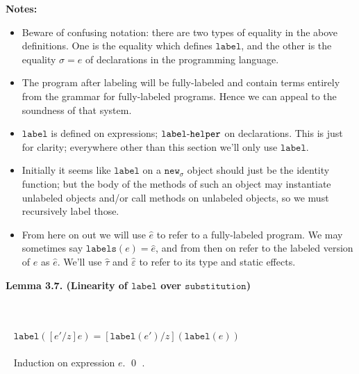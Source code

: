 \documentclass{llncs}
\newcommand{\keywadj}[1]{\mathtt{#1}}
\newcommand{\hyphen}{\hbox{-}}
\newcommand{\thm}[3]{
	\begin{large}
		\bf{#1}
	\end{large} \\\\
	\fbox{Statement.} ~ #2
	\fbox{Proof.}~ #3 \qed
}
\begin{document}
\noindent \textbf{Notes:}
\begin{itemize}
\item Beware of confusing notation: there are two types of equality in the above definitions. One is the equality which defines $\keywadj{label}$, and the other is the equality $\sigma = e$ of declarations in the programming language.
\item The program after labeling will be fully-labeled and contain terms entirely from the grammar for fully-labeled programs. Hence we can appeal to the soundness of that system.
\item $\keywadj{label}$ is defined on expressions; $\keywadj{label \hyphen helper}$ on declarations. This is just for clarity; everywhere other than this section we'll only use $\keywadj{label}$.
\item Initially it seems like $\keywadj{label}$ on a $\keywadj{new_\sigma}$ object should just be the identity function; but the body of the methods of such an object may instantiate unlabeled objects and/or call methods on unlabeled objects, so we must recursively label those.
\item From here on out we will use $\hat e$ to refer to a fully-labeled program. We may sometimes say $\keywadj{labels}(e) = \hat e$, and from then on refer to the labeled version of $e$ as $\hat e$. We'll use $\hat \tau$ and $\hat \varepsilon$ to refer to its type and static effects.
\end{itemize}



\noindent
\thm{Lemma 3.7. (Linearity of $\keywadj{label}$ over $\keywadj{substitution}$)}
{$\keywadj{label}([e'/z]e) = [\keywadj{label}(e')/z](\keywadj{label}(e))$\\\\}
{Induction on expression $e$.}.
\end{document}
